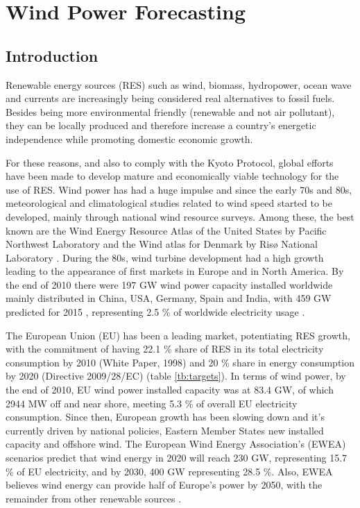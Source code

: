 \chapter{Wind Power Forecasting} \label{sec:wp_forecasting}

\FloatBarrier
\section{Introduction}
\label{sec:wp_intro}

Renewable energy sources (RES) such as wind, biomass, hydropower, ocean wave and currents are increasingly being considered real alternatives to fossil fuels. Besides being more environmental friendly (renewable and not air pollutant), they can be locally produced and therefore increase a country's energetic independence while promoting domestic economic growth. 

For these reasons, and also to comply with the Kyoto Protocol, global efforts have been made to develop mature and economically viable technology for the use of RES. Wind power has had a huge impulse and since the early 70s and 80s, meteorological and climatological studies related to wind speed started to be developed, mainly through national wind resource surveys.  Among these, the best known are the Wind Energy Resource Atlas of the United States by Pacific Northwest Laboratory \citep{USAtlas1987} and the Wind atlas for Denmark  by Ris\o{} National Laboratory \citep{DenAtlas1981}. During the 80s, wind turbine development had a high growth leading to the appearance of first markets in Europe and in North America. By the end of 2010 there were 197 GW wind power capacity installed worldwide mainly distributed in China, USA, Germany, Spain and India, with 459 GW predicted for 2015 \citep{GWEC2010rep}, representing 2.5 \% of worldwide electricity usage \citep{WWEA2010}.

The European Union (EU) has been a leading market, potentiating RES growth, with the commitment of having 22.1 \% share of RES in its total electricity consumption by 2010 (White Paper, 1998) and 20 \% share in energy consumption by 2020 (Directive 2009/28/EC) (table \ref{tb:targets}). In terms of wind power, by the end of 2010, EU wind power installed capacity was at 83.4 GW, of which 2944 MW off and near shore, meeting 5.3 \% of overall EU electricity consumption. Since then, European growth has been slowing down and it's currently driven by national policies, Eastern Member States new installed capacity and offshore wind. The European Wind Energy Association's (EWEA) scenarios predict that wind energy in 2020 will reach 230 GW, representing 15.7 \% of EU electricity, and by 2030, 400 GW representing 28.5 \%. Also, EWEA believes wind energy can provide half of Europe's power by 2050, with the remainder from other renewable sources \citep{EWEA2011}.

